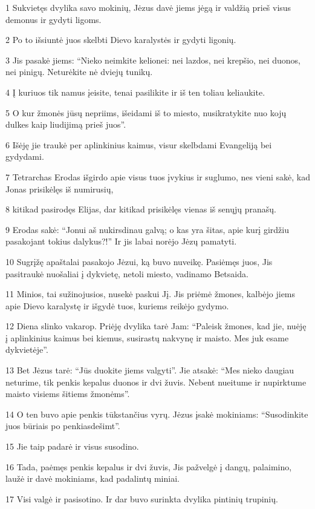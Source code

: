 \par 1 Sukvietęs dvylika savo mokinių, Jėzus davė jiems jėgą ir valdžią prieš visus demonus ir gydyti ligoms. 
\par 2 Po to išsiuntė juos skelbti Dievo karalystės ir gydyti ligonių. 
\par 3 Jis pasakė jiems: “Nieko neimkite kelionei: nei lazdos, nei krepšio, nei duonos, nei pinigų. Neturėkite nė dviejų tunikų. 
\par 4 Į kuriuos tik namus įeisite, tenai pasilikite ir iš ten toliau keliaukite. 
\par 5 O kur žmonės jūsų nepriims, išeidami iš to miesto, nusikratykite nuo kojų dulkes kaip liudijimą prieš juos”. 
\par 6 Išėję jie traukė per aplinkinius kaimus, visur skelbdami Evangeliją bei gydydami. 
\par 7 Tetrarchas Erodas išgirdo apie visus tuos įvykius ir suglumo, nes vieni sakė, kad Jonas prisikėlęs iš numirusių, 
\par 8 kiti­kad pasirodęs Elijas, dar kiti­kad prisikėlęs vienas iš senųjų pranašų. 
\par 9 Erodas sakė: “Jonui aš nukirsdinau galvą; o kas yra šitas, apie kurį girdžiu pasakojant tokius dalykus?!” Ir jis labai norėjo Jėzų pamatyti. 
\par 10 Sugrįžę apaštalai pasakojo Jėzui, ką buvo nuveikę. Pasiėmęs juos, Jis pasitraukė nuošaliai į dykvietę, netoli miesto, vadinamo Betsaida. 
\par 11 Minios, tai sužinojusios, nusekė paskui Jį. Jis priėmė žmones, kalbėjo jiems apie Dievo karalystę ir išgydė tuos, kuriems reikėjo gydymo. 
\par 12 Diena slinko vakarop. Priėję dvylika tarė Jam: “Paleisk žmones, kad jie, nuėję į aplinkinius kaimus bei kiemus, susirastų nakvynę ir maisto. Mes juk esame dykvietėje”. 
\par 13 Bet Jėzus tarė: “Jūs duokite jiems valgyti”. Jie atsakė: “Mes nieko daugiau neturime, tik penkis kepalus duonos ir dvi žuvis. Nebent nueitume ir nupirktume maisto visiems šitiems žmonėms”. 
\par 14 O ten buvo apie penkis tūkstančius vyrų. Jėzus įsakė mokiniams: “Susodinkite juos būriais po penkiasdešimt”. 
\par 15 Jie taip padarė ir visus susodino. 
\par 16 Tada, paėmęs penkis kepalus ir dvi žuvis, Jis pažvelgė į dangų, palaimino, laužė ir davė mokiniams, kad padalintų miniai. 
\par 17 Visi valgė ir pasisotino. Ir dar buvo surinkta dvylika pintinių trupinių. 
